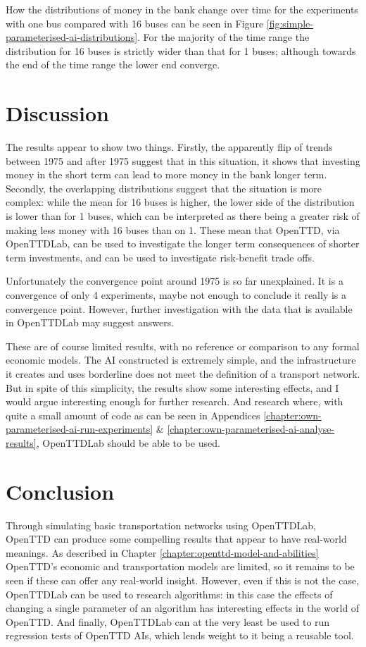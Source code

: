 \documentclass[logo,msc,dsti]{style/infthesis}    %
\begin{document}
{How the distributions of money in the bank change over time for the experiments with one bus compared with 16 buses can be seen in Figure \ref{fig:simple-parameterised-ai-distributions}. For the majority of the time range the distribution for 16 buses is strictly wider than that for 1 buses; although towards the end of the time range the lower end converge.

\section{Discussion}

The results appear to show two things. Firstly, the apparently flip of trends between 1975 and after 1975 suggest that in this situation, it shows that investing money in the short term can lead to more money in the bank longer term. Secondly, the overlapping distributions suggest that the situation is more complex: while the mean for 16 buses is higher, the lower side of the distribution is lower than for 1 buses, which can be interpreted as there being a greater risk of making less money with 16 buses than on 1. These mean that OpenTTD, via OpenTTDLab, can be used to investigate the longer term consequences of shorter term investments, and can be used to investigate risk-benefit trade offs.

Unfortunately the convergence point around 1975 is so far unexplained. It is a convergence of only 4 experiments, maybe not enough to conclude it really is a convergence point. However, further investigation with the data that is available in OpenTTDLab may suggest answers.

These are of course limited results, with no reference or comparison to any formal economic models. The AI constructed is extremely simple, and the infrastructure it creates and uses borderline does not meet the definition of a transport network. But in spite of this simplicity, the results show some interesting effects, and I would argue interesting enough for further research. And research where, with quite a small amount of code as can be seen in Appendices \ref{chapter:own-parameterised-ai-run-experiments} \& \ref{chapter:own-parameterised-ai-analyse-results}, OpenTTDLab should be able to be used.

\section{Conclusion}

Through simulating basic transportation networks using OpenTTDLab, OpenTTD can produce some compelling results that appear to have real-world meanings. As described in Chapter \ref{chapter:openttd-model-and-abilities} OpenTTD's economic and transportation models are limited, so it remains to be seen if these can offer any real-world insight. However, even if this is not the case, OpenTTDLab can be used to research algorithms: in this case the effects of changing a single parameter of an algorithm has interesting effects in the world of OpenTTD. And finally, OpenTTDLab can at the very least be used to run regression tests of OpenTTD AIs, which lends weight to it being a reusable tool.

}
\end{document}
